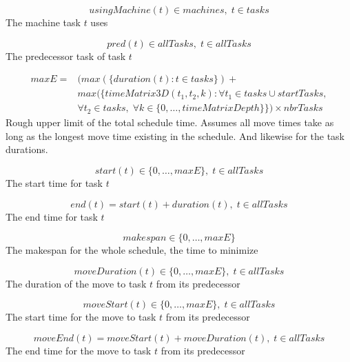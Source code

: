 \documentclass[10pt,a4paper]{report}
\begin{document}
\begin{equation}\label{eq:40}
usingMachine(t) \in machines, \; t \in tasks\end{equation}
The machine task $t$ uses

\begin{equation}\label{eq:41}
pred(t) \in allTasks, \; t \in allTasks\end{equation}
The predecessor task of task $t$

\begin{equation}
\begin{aligned}\label{eq:45}
maxE = &(max(\{duration(t) : t \in tasks\}) +  \\ 
&max(\{timeMatrix3D(t_1,t_2,k) : \forall t_1 \in tasks \cup startTasks,  \\ 
&\forall t_2 \in tasks, \; \forall k \in \{0 , \ldots , timeMatrixDepth\}\}) \times nbrTasks
\end{aligned}
\end{equation}
Rough upper limit of the total schedule time. Assumes all move times take as long as the longest move time existing in the schedule. And likewise for the task durations.

\begin{equation}\label{eq:46}
start(t) \in \{0 , \ldots , maxE\}, \; t \in allTasks\end{equation}
The start time for task $t$

\begin{equation}\label{eq:47}
end(t) = start(t) + duration(t), \; t \in allTasks\end{equation}
The end time for task $t$

\begin{equation}\label{eq:48}
makespan \in \{0 , \ldots , maxE\}\end{equation}
The makespan for the whole schedule, the time to minimize

\begin{equation}\label{eq:49}
moveDuration(t) \in \{0 , \ldots , maxE\}, \; t \in allTasks\end{equation}
The duration of the move to task $t$ from its predecessor

\begin{equation}\label{eq:50}
moveStart(t) \in \{0 , \ldots , maxE\}, \; t \in allTasks\end{equation}
The start time for the move to task $t$ from its predecessor

\begin{equation}\label{eq:51}
moveEnd(t) = moveStart(t) + moveDuration(t), \; t \in allTasks\end{equation}
The end time for the move to task $t$ from its predecessor
\end{document}
